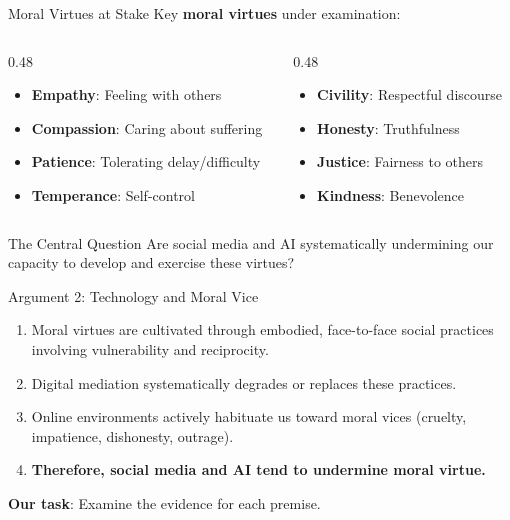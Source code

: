 ﻿\documentclass[aspectratio=169,11pt]{beamer}
\begin{document}
\begin{frame}{Moral Virtues at Stake}
Key \textbf{moral virtues} under examination:

\begin{columns}[T]
\begin{column}{0.48\textwidth}
\begin{itemize}
    \item \textbf{Empathy}: Feeling with others
    \item \textbf{Compassion}: Caring about suffering
    \item \textbf{Patience}: Tolerating delay/difficulty
    \item \textbf{Temperance}: Self-control
\end{itemize}
\end{column}
\begin{column}{0.48\textwidth}
\begin{itemize}
    \item \textbf{Civility}: Respectful discourse
    \item \textbf{Honesty}: Truthfulness
    \item \textbf{Justice}: Fairness to others
    \item \textbf{Kindness}: Benevolence
\end{itemize}
\end{column}
\end{columns}

\vspace{0.5cm}
\begin{alertblock}{The Central Question}
Are social media and AI systematically undermining our capacity to develop and exercise these virtues?
\end{alertblock}
\end{frame}

\begin{frame}{Argument 2: Technology and Moral Vice}
\begin{argumentbox}
\begin{enumerate}
    \item Moral virtues are cultivated through embodied, face-to-face social practices involving vulnerability and reciprocity.
    \item Digital mediation systematically degrades or replaces these practices.
    \item Online environments actively habituate us toward moral vices (cruelty, impatience, dishonesty, outrage).
    \item[\textbf{C.}] \textbf{Therefore, social media and AI tend to undermine moral virtue.}
\end{enumerate}
\end{argumentbox}

\vspace{0.3cm}
\textbf{Our task}: Examine the evidence for each premise.
\end{frame}
\end{document}

